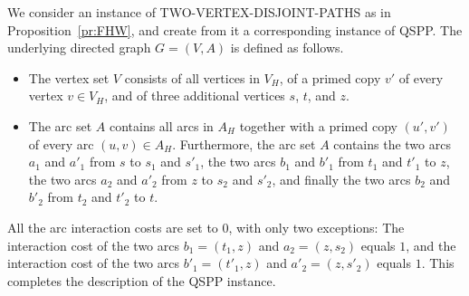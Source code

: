 \documentclass[11pt,fleqn]{article}
\begin{document}
We consider an instance of TWO-VERTEX-DISJOINT-PATHS as in Proposition~\ref{pr:FHW},
and create from it a corresponding instance of QSPP.
The underlying directed graph $G=(V,A)$ is defined as follows.
\begin{itemize}
\item The vertex set $V$ consists of all vertices in $V_H$, of a primed copy $v'$ of every
vertex $v\in V_H$, and of three additional vertices $s$, $t$, and $z$.
\item The arc set $A$ contains all arcs in $A_H$ together with a primed copy $(u',v')$
of every arc $(u,v)\in A_H$.
Furthermore, the arc set $A$ contains
the two arcs $a_1$ and $a'_1$ from $s$ to $s_1$ and $s'_1$,
the two arcs $b_1$ and $b'_1$ from $t_1$ and $t'_1$ to $z$,
the two arcs $a_2$ and $a'_2$ from $z$ to $s_2$ and $s'_2$, and finally
the two arcs $b_2$ and $b'_2$ from $t_2$ and $t'_2$ to $t$.
\end{itemize}
All the arc interaction costs are set to $0$, with only two exceptions:
The interaction cost of the two arcs $b_1=(t_1,z)$ and $a_2=(z,s_2)$ equals $1$, and
the interaction cost of the two arcs $b'_1=(t'_1,z)$ and $a'_2=(z,s'_2)$ equals $1$.
This completes the description of the QSPP instance.
\end{document}
